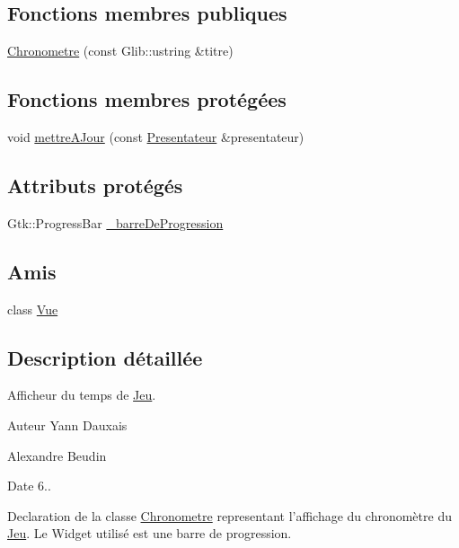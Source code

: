 \subsection*{Fonctions membres publiques}
\begin{DoxyCompactItemize}
\item 
\hyperlink{classgrenouilloland_1_1Chronometre_a7331d6bd863468b99f501c9ef72f3d18}{Chronometre} (const Glib\-::ustring \&titre)
\end{DoxyCompactItemize}
\subsection*{Fonctions membres protégées}
\begin{DoxyCompactItemize}
\item 
void \hyperlink{classgrenouilloland_1_1Chronometre_ac7b8f9ef96571fdda6f3a328aec1db8d}{mettre\-A\-Jour} (const \hyperlink{classgrenouilloland_1_1Presentateur}{Presentateur} \&presentateur)
\end{DoxyCompactItemize}
\subsection*{Attributs protégés}
\begin{DoxyCompactItemize}
\item 
Gtk\-::\-Progress\-Bar \hyperlink{classgrenouilloland_1_1Chronometre_a0d69d261d1caf45e33f310cbc3132d6d}{\-\_\-barre\-De\-Progression}
\end{DoxyCompactItemize}
\subsection*{Amis}
\begin{DoxyCompactItemize}
\item 
class \hyperlink{classgrenouilloland_1_1Chronometre_adc3b1810b8d3988a7832f57c330fe4fd}{Vue}
\end{DoxyCompactItemize}


\subsection{Description détaillée}
Afficheur du temps de \hyperlink{classgrenouilloland_1_1Jeu}{Jeu}. 

\begin{DoxyAuthor}{Auteur}
Yann Dauxais 

Alexandre Beudin 
\end{DoxyAuthor}
\begin{DoxyDate}{Date}
6..
\end{DoxyDate}
Declaration de la classe \hyperlink{classgrenouilloland_1_1Chronometre}{Chronometre} representant l'affichage du chronomètre du \hyperlink{classgrenouilloland_1_1Jeu}{Jeu}. Le Widget utilisé est une barre de progression.

